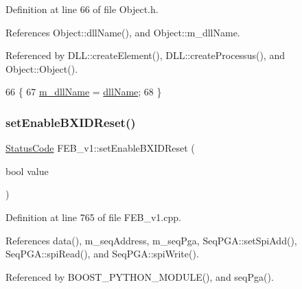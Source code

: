 Definition at line 66 of file Object.\+h.



References Object\+::dll\+Name(), and Object\+::m\+\_\+dll\+Name.



Referenced by D\+L\+L\+::create\+Element(), D\+L\+L\+::create\+Processus(), and Object\+::\+Object().


\begin{DoxyCode}
66                                       \{
67     \hyperlink{classObject_a01afbeacebb8db6831559972ec362eb3}{m\_dllName} = \hyperlink{classObject_a2e3947f2870094c332d7454117f3ec63}{dllName};
68   \}
\end{DoxyCode}
\mbox{\label{classFEB__v1_a2ad20ff9db6a0ceef875d874bae214a9}} 
\subsubsection{\texorpdfstring{set\+Enable\+B\+X\+I\+D\+Reset()}{setEnableBXIDReset()}}
{\footnotesize\ttfamily \hyperlink{classStatusCode}{Status\+Code} F\+E\+B\+\_\+v1\+::set\+Enable\+B\+X\+I\+D\+Reset (\begin{DoxyParamCaption}\item[{bool}]{value }\end{DoxyParamCaption})}



Definition at line 765 of file F\+E\+B\+\_\+v1.\+cpp.



References data(), m\+\_\+seq\+Address, m\+\_\+seq\+Pga, Seq\+P\+G\+A\+::set\+Spi\+Add(), Seq\+P\+G\+A\+::spi\+Read(), and Seq\+P\+G\+A\+::spi\+Write().



Referenced by B\+O\+O\+S\+T\+\_\+\+P\+Y\+T\+H\+O\+N\+\_\+\+M\+O\+D\+U\+L\+E(), and seq\+Pga().


